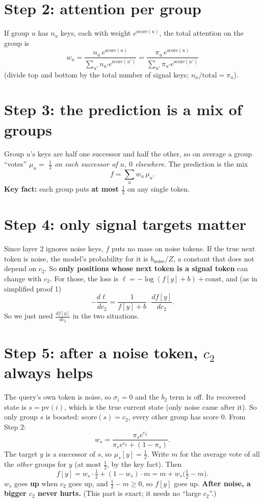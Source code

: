 \documentclass[11pt]{article}
\newcommand{\1}{\mathbf{1}}
\begin{document}
\section{Step 2: attention per group}
If group $u$ has $n_u$ keys, each with weight $e^{\mathrm{score}(u)}$, the total attention on the group is
\[
w_u=\frac{n_u\,e^{\mathrm{score}(u)}}{\sum_{u'}n_{u'}e^{\mathrm{score}(u')}}
=\frac{\pi_u\,e^{\mathrm{score}(u)}}{\sum_{u'}\pi_{u'}e^{\mathrm{score}(u')}}
\]
(divide top and bottom by the total number of signal keys; $n_u/\text{total}=\pi_u$).

\section{Step 3: the prediction is a mix of groups}
Group $u$'s keys are half one successor and half the other, so on average a group ``votes''
$\mu_u=$ \emph{$\tfrac12$ on each successor of $u$, $0$ elsewhere}. The prediction is the mix
\[
f=\sum_uw_u\,\mu_u .
\]
\textbf{Key fact:} each group puts \textbf{at most $\tfrac12$} on any single token.

\section{Step 4: only signal targets matter}
Since layer 2 ignores noise keys, $f$ puts no mass on noise tokens. If the true next token is noise,
the model's probability for it is $b_{\mathrm{noise}}/Z$, a constant that does not depend on $c_2$. So
\textbf{only positions whose next token is a signal token} can change with $c_2$. For those, the loss is
$\ell=-\log(f[y]+b)+\text{const}$, and (as in simplified proof 1)
\[
-\frac{d\ell}{dc_2}=\frac{1}{f[y]+b}\cdot\frac{d f[y]}{dc_2}.
\]
So we just need $\frac{df[y]}{dc_2}$ in the two situations.

\section{Step 5: after a noise token, $c_2$ always helps}
The query's own token is noise, so $\sigma_i=0$ and the $b_2$ term is off. Its recovered state is
$s=\mathrm{pv}(i)$, which is the true current state (only noise came after it). So only group $s$ is
boosted: $\mathrm{score}(s)=c_2$, every other group has score $0$. From Step 2:
\[
w_s=\frac{\pi_se^{c_2}}{\pi_se^{c_2}+(1-\pi_s)} .
\]
The target $y$ is a successor of $s$, so $\mu_s[y]=\tfrac12$. Write $m$ for the average vote of all the
\emph{other} groups for $y$ (at most $\tfrac12$, by the key fact). Then
\[
f[y]=w_s\cdot\tfrac12+(1-w_s)\cdot m=m+w_s\big(\tfrac12-m\big).
\]
$w_s$ goes \textbf{up} when $c_2$ goes up, and $\tfrac12-m\ge0$, so $f[y]$ goes up.
\textbf{After noise, a bigger $c_2$ never hurts.} (This part is exact; it needs no ``large $c_2$''.)
\end{document}
